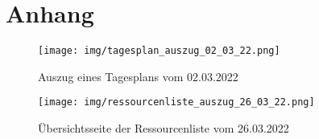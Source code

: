 \section{Anhang}\label{sec:anhang}







\begin{figure}[H]
    \texttt{[image: img/tagesplan\_auszug\_02\_03\_22.png]}
    \caption{Auszug eines Tagesplans vom 02.03.2022}\label{fig:tagesplan}
\end{figure}

\begin{figure}[H]
    \texttt{[image: img/ressourcenliste\_auszug\_26\_03\_22.png]}
    \caption{Übersichtsseite der Ressourcenliste vom 26.03.2022}\label{fig:ressourcenliste}
\end{figure}
